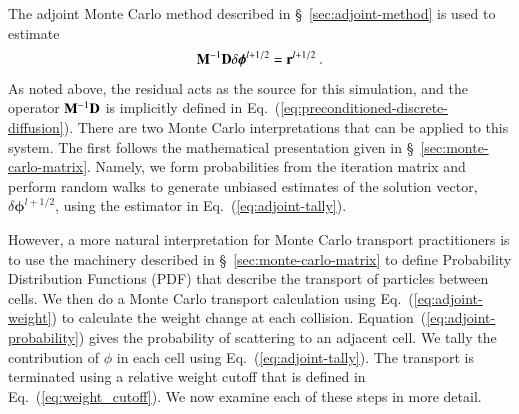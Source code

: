 \documentclass[preprint,12pt]{elsarticle}
\newcommand{\vr}{\ensuremath{\ve{r}}}
\newcommand{\bphi}{\ensuremath{\boldsymbol{\phi}}}
\begin{document}
The adjoint Monte Carlo method described in
\S~\ref{sec:adjoint-method} is used to estimate
\begin{equation}
  \ve{M}^{-1}\ve{D}\delta\bphi^{l+1/2} = \vr^{l+1/2}\:.
\end{equation}
As noted above, the residual acts as the source for this simulation,
and the operator $\mathbf{M}^{-1}\mathbf{D}$ is implicitly defined in
Eq.~(\ref{eq:preconditioned-discrete-diffusion}).  There are two Monte
Carlo interpretations that can be applied to this system.  The first
follows the mathematical presentation given in
\S~\ref{sec:monte-carlo-matrix}.  Namely, we form probabilities from
the iteration matrix and perform random walks to generate unbiased
estimates of the solution vector, $\delta\bphi^{l+1/2}$, using the
estimator in Eq.~(\ref{eq:adjoint-tally}).

However, a more natural interpretation for Monte Carlo transport
practitioners is to use the machinery described in
\S~\ref{sec:monte-carlo-matrix} to define Probability Distribution
Functions (PDF) that describe the transport of particles between
cells.  We then do a Monte Carlo transport calculation using
Eq.~(\ref{eq:adjoint-weight}) to calculate the weight change at each
collision. Equation~(\ref{eq:adjoint-probability}) gives the
probability of scattering to an adjacent cell. We tally the
contribution of $\phi$ in each cell using
Eq.~(\ref{eq:adjoint-tally}).  The transport is terminated using a
relative weight cutoff that is defined in
Eq.~(\ref{eq:weight_cutoff}).  We now examine each of these steps in
more detail.
\end{document}
